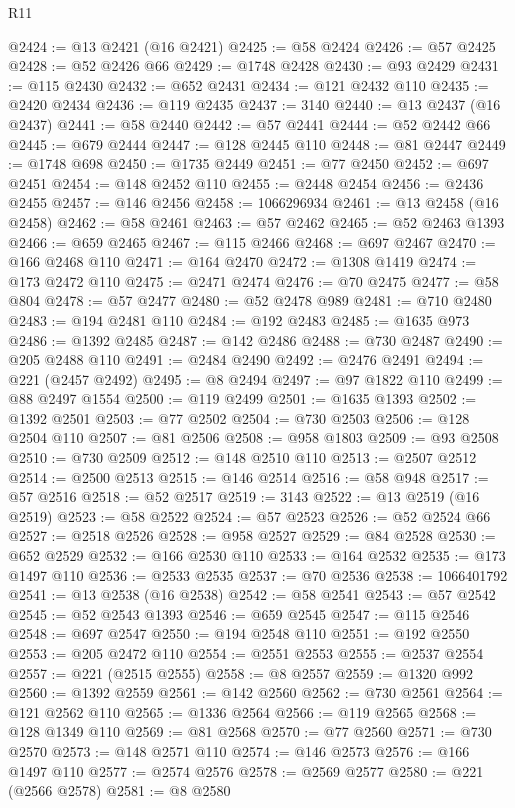 \begin{lexlean}{R11}
\begin{coremodule}
@2424 := @13 @2421 (@16 @2421)
@2425 := @58 @2424
@2426 := @57 @2425
@2428 := @52 @2426 @66
@2429 := @1748 @2428
@2430 := @93 @2429
@2431 := @115 @2430
@2432 := @652 @2431
@2434 := @121 @2432 @110
@2435 := @2420 @2434
@2436 := @119 @2435
@2437 := 3140
@2440 := @13 @2437 (@16 @2437)
@2441 := @58 @2440
@2442 := @57 @2441
@2444 := @52 @2442 @66
@2445 := @679 @2444
@2447 := @128 @2445 @110
@2448 := @81 @2447
@2449 := @1748 @698
@2450 := @1735 @2449
@2451 := @77 @2450
@2452 := @697 @2451
@2454 := @148 @2452 @110
@2455 := @2448 @2454
@2456 := @2436 @2455
@2457 := @146 @2456
@2458 := 1066296934
@2461 := @13 @2458 (@16 @2458)
@2462 := @58 @2461
@2463 := @57 @2462
@2465 := @52 @2463 @1393
@2466 := @659 @2465
@2467 := @115 @2466
@2468 := @697 @2467
@2470 := @166 @2468 @110
@2471 := @164 @2470
@2472 := @1308 @1419
@2474 := @173 @2472 @110
@2475 := @2471 @2474
@2476 := @70 @2475
@2477 := @58 @804
@2478 := @57 @2477
@2480 := @52 @2478 @989
@2481 := @710 @2480
@2483 := @194 @2481 @110
@2484 := @192 @2483
@2485 := @1635 @973
@2486 := @1392 @2485
@2487 := @142 @2486
@2488 := @730 @2487
@2490 := @205 @2488 @110
@2491 := @2484 @2490
@2492 := @2476 @2491
@2494 := @221 (@2457 @2492)
@2495 := @8 @2494
@2497 := @97 @1822 @110
@2499 := @88 @2497 @1554
@2500 := @119 @2499
@2501 := @1635 @1393
@2502 := @1392 @2501
@2503 := @77 @2502
@2504 := @730 @2503
@2506 := @128 @2504 @110
@2507 := @81 @2506
@2508 := @958 @1803
@2509 := @93 @2508
@2510 := @730 @2509
@2512 := @148 @2510 @110
@2513 := @2507 @2512
@2514 := @2500 @2513
@2515 := @146 @2514
@2516 := @58 @948
@2517 := @57 @2516
@2518 := @52 @2517
@2519 := 3143
@2522 := @13 @2519 (@16 @2519)
@2523 := @58 @2522
@2524 := @57 @2523
@2526 := @52 @2524 @66
@2527 := @2518 @2526
@2528 := @958 @2527
@2529 := @84 @2528
@2530 := @652 @2529
@2532 := @166 @2530 @110
@2533 := @164 @2532
@2535 := @173 @1497 @110
@2536 := @2533 @2535
@2537 := @70 @2536
@2538 := 1066401792
@2541 := @13 @2538 (@16 @2538)
@2542 := @58 @2541
@2543 := @57 @2542
@2545 := @52 @2543 @1393
@2546 := @659 @2545
@2547 := @115 @2546
@2548 := @697 @2547
@2550 := @194 @2548 @110
@2551 := @192 @2550
@2553 := @205 @2472 @110
@2554 := @2551 @2553
@2555 := @2537 @2554
@2557 := @221 (@2515 @2555)
@2558 := @8 @2557
@2559 := @1320 @992
@2560 := @1392 @2559
@2561 := @142 @2560
@2562 := @730 @2561
@2564 := @121 @2562 @110
@2565 := @1336 @2564
@2566 := @119 @2565
@2568 := @128 @1349 @110
@2569 := @81 @2568
@2570 := @77 @2560
@2571 := @730 @2570
@2573 := @148 @2571 @110
@2574 := @146 @2573
@2576 := @166 @1497 @110
@2577 := @2574 @2576
@2578 := @2569 @2577
@2580 := @221 (@2566 @2578)
@2581 := @8 @2580

\end{coremodule}
\end{lexlean}
